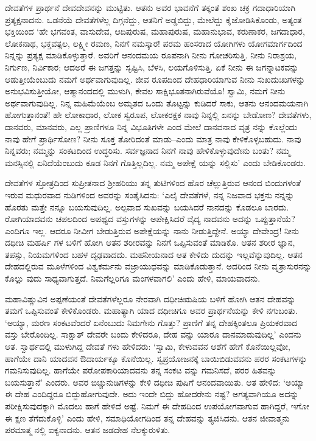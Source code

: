 ದೇವತೆಗಳ ಪ್ರಾರ್ಥನೆ ದೇವದೇವನನ್ನು ಮುಟ್ಟಿತು. ಆತನು ಅವರ ಭಾವನೆಗೆ ತಕ್ಕಂತೆ ಶಂಖ ಚಕ್ರ ಗದಾಧಾರಿಯಾಗಿ ಪ್ರತ್ಯಕ್ಷನಾದನು. ಒಡನೆಯೆ ದೇವತೆಗಳೆಲ್ಲ ದಿಗ್ಗನೆದ್ದು, ಆತನಿಗೆ ಅಡ್ಡಬಿದ್ದು, ಮೇಲೆದ್ದು ಕೈಜೋಡಿಸಿಕೊಂಡು, ಅತ್ಯಂತ ಭಕ್ತಿಯಿಂದ ‘ಹೇ ಭಗವಂತ, ವಾಸುದೇವ, ಆದಿಪುರುಷ, ಮಹಾಪುರುಷ, ಮಹಾನುಭಾವ, ಕರುಣಾಕರ, ಜಗದಾಧಾರ, ಲೋಕನಾಥ, ಭಕ್ತವತ್ಸಲ, ಲಕ್ಷ್ಮೀ ರಮಣ, ನಿನಗೆ ನಮಸ್ಕಾರ! ಪರಮ ಹಂಸರಾದ ಯೋಗಿಗಳು ಯೋಗಮಾರ್ಗದಿಂದ ನಿನ್ನನ್ನು ಪ್ರತ್ಯಕ್ಷ ಮಾಡಿಕೊಳ್ಳುತ್ತಾರೆ. ಅವರಿಗೆ ಆನಂದಮಯ ರೂಪನಾಗಿ ನೀನು ಗೋಚರಿಸುತ್ತಿ. ನೀನು ನಿರಾಶ್ರಯ, ನಿರ್ಗುಣ, ನಿರ್ವಿಕಾರ; ಆದಅರೆ ಈ ಜಗತ್ತನ್ನು ಸೃಷ್ಟಿಸಿ, ಬೆಳಸಿ, ಲಯಗೊಳಿಸುತ್ತಿ. ಏಕೆ ನೀನು ಈ ಜಗನ್ನಾಟಕವನ್ನು ಆಡುತ್ತೀಯೆಂಬುದು ನಮಗೆ ಅರ್ಥವಾಗುವುದಿಲ್ಲ. ಜೀವ ರೂಪದಿಂದ ದೇಹಧಾರಿಯಾಗುವ ನೀನು ಸುಖದುಃಖಗಳನ್ನು ಅನುಭವಿಸುತ್ತೀಯೋ, ಆತ್ಮಾನಂದದಲ್ಲಿ ಮುಳುಗಿ, ಕೇವಲ ಸಾಕ್ಷಿಭೂತನಾಗಿರುವೆಯೊ! ಸ್ವಾಮಿ, ನಮಗೆ ನೀನು ಅರ್ಥವಾಗುವುದಿಲ್ಲ. ನಿನ್ನ ಮಹಿಮೆಯೆಂಬ ಅಮೃತದ ಒಂದು ತೊಟ್ಟನ್ನು ಕುಡಿದರೆ ಸಾಕು, ಆತನು ಆನಂದಮಯನಾಗಿ ಹೋಗುತ್ತಾನಂತೆ! ಹೇ ಲೋಕಾಧಾರ, ಲೋಕ ಸ್ವರೂಪ, ಲೋಕರಕ್ಷಕ ನಾವು ನಿನ್ನಲ್ಲಿ ಏನನ್ನು ಬೇಡೋಣ? ದೇವತೆಗಳು, ದಾನವರು, ಮಾನವರು, ಎಲ್ಲ ಪ್ರಾಣಿಗಳೂ ನಿನ್ನ ವಿಭೂತಿಗಳೇ ಎಂದ ಮೇಲೆ ದಾನವನಾದ ವೃತ್ರ ನನ್ನು ಕೊಲ್ಲೆಂದು ನಾವು ಹೇಗೆ ಪ್ರಾರ್ಥಿಸೋಣ? ನೀನು ಸೂಕ್ತ ತೋರಿದಂತೆ ಮಾಡು–ಎಂದು ಮಾತ್ರ ನಾವು ಕೇಳಿಕೊಳ್ಳಬಹುದು. ನಾವು ನಿನ್ನವರು; ನಮ್ಮನ್ನು ಸಂಕಟದಿಂದ ಉದ್ಧರಿಸು. ಸರ್ವಜ್ಞನಾದ ನಿನಗೆ ನಾವು ಹೇಳಿಕೊಳ್ಳುವುದೇನು ಬಂತು? ನಮ್ಮ ಮನಸ್ಸಿನಲ್ಲಿ ಏನಿದೆಯೆಂಬುದು ಕೂಡ ನಿನಗೆ ಗೊತ್ತಿಲ್ಲದಿಲ್ಲ. ನಮ್ಮ ಅಪೇಕ್ಷೆ ಯನ್ನು ಸಲ್ಲಿಸು’ ಎಂದು ಬೇಡಿಕೊಂಡರು. 

ದೇವತೆಗಳ ಸ್ತೋತ್ರದಿಂದ ಸುಪ್ರೀತನಾದ ಶ್ರೀಹರಿಯು ತನ್ನ ತುಟಿಗಳಿಂದ ಹೊರ ಚೆಲ್ಲುತ್ತಿರುವ ಆನಂದ ಬಿಂದುಗಳಂತೆ ಇರುವ ಮಧುರವಾದ ನುಡಿಗಳಿಂದ ಅವರನ್ನು ಸಂತೈಸಿದನು: ‘ಎಲೈ ದೇವತೆಗಳೆ, ನನ್ನ ನಿಜವಾದ ಭಕ್ತನು ನನ್ನನ್ನು ಹೊರತು ಮತ್ತೇ ನನ್ನೂ ಬಯಸುವುದಿಲ್ಲ. ಅಲ್ಪವಾದ ಸುಖವನ್ನು ಬಯಸಿದರೆ ನಾನದನ್ನು ಕೊಡಲೂ ಬಾರದು. ರೋಗಿಯಾದವನು ಚಪಲದಿಂದ ಅಪಥ್ಯದ ವಸ್ತುಗಳನ್ನು ಅಪೇಕ್ಷಿಸಿದರೆ ವೈದ್ಯ ನಾದವನು ಅದನ್ನು ಒಪ್ಪುತ್ತಾನೆಯೆ? ಎಂದಿಗೂ ಇಲ್ಲ. ಆದರೂ ನೀವೀಗ ಬೇಡುತ್ತಿರುವ ಅಪೇಕ್ಷೆಯನ್ನು ನಾನು ನೀಡುತ್ತಿದ್ದೇನೆ. ಅಯ್ಯಾ ದೇವೇಂದ್ರ! ನೀನು ದಧೀಚಿ ಮಹರ್ಷಿ ಗಳ ಬಳಿಗೆ ಹೋಗಿ ಆತನ ಶರೀರವನ್ನು ನಿನಗೆ ಒಪ್ಪಿಸುವಂತೆ ಮಾಡಿಕೊ. ಆತನ ಶರೀರ ಜ್ಞಾನ, ತಪಸ್ಸು, ನಿಯಮಗಳಿಂದ ಬಹಳ ದೃಢವಾದದು. ಮಹನೀಯನಾದ ಆತ ಕೇಳಿದು ದುದನ್ನು ಇಲ್ಲವೆನ್ನುವುದಿಲ್ಲ. ಆತನ ದೇಹದಲ್ಲಿರುವ ಮೂಳೆಗಳಿಂದ ವಿಶ್ವಕರ್ಮನು ವಜ್ರಾಯುಧವನ್ನು ಮಾಡಿಕೊಡುತ್ತಾನೆ. ಅದರಿಂದ ನೀನು ವೃತ್ರಾಸುರನನ್ನು ಕೊಲ್ಲು ವುದು ಸಾಧ್ಯವಾಗುತ್ತದೆ. ನಿಮಗೆಲ್ಲರಿಗೂ ಮಂಗಳವಾಗಲಿ’ ಎಂದು ಹೇಳಿ, ಮಾಯವಾದನು.

ಮಹಾವಿಷ್ಣುವಿನ ಅಪ್ಪಣೆಯಂತೆ ದೇವತೆಗಳೆಲ್ಲರೂ ನೇರವಾಗಿ ದಧೀಚಿಋಷಿಯ ಬಳಿಗೆ ಹೋಗಿ ಆತನ ದೇಹವನ್ನು ತಮಗೆ ಒಪ್ಪಿಸುವಂತೆ ಕೇಳಿಕೊಂಡರು. ಮಹಾತ್ಯಾಗಿ ಯಾದ ದಧೀಚಿಗೂ ಅವರ ಪ್ರಾರ್ಥನೆಯನ್ನು ಕೇಳಿ ನಗುಬಂತು. ‘ಅಯ್ಯಾ, ಮರಣ ಸಂಕಟವೆಂದರೆ ಏನೆಂಬುದು ನಿಮಗೇನು ಗೊತ್ತು? ಪ್ರಾಣಿಗೆ ತನ್ನ ದೇಹಕ್ಕಿಂತಲೂ ಪ್ರಿಯಕರವಾದ ವಸ್ತು ಬೇರೊಂದಿಲ್ಲ. ಸಾಕ್ಷಾತ್ ದೇವರೇ ಬಂದು ಕೇಳಿದರೂ, ದೇಹ ವನ್ನು ಯಾರೂ ದಾನಮಾಡುವುದಿಲ್ಲ’ ಎಂದನು ಆತ. ಸ್ವಾರ್ಥದಲ್ಲಿ ಮುಳುಗಿದ್ದ ದೇವತೆ ಗಳು ಹೇಳಿದರು: ‘ಸ್ವಾಮಿ, ಕೇಳುವವನ ಆಶೆಗೆ ಹೇಗೆ ಕೊನೆಯಿಲ್ಲವೋ, ಹಾಗೆಯೇ ದಾನಿ ಯಾದವನ ಔದಾರ್ಯಕ್ಕೂ ಕೊನೆಯಿಲ್ಲ. ಸ್ವಪ್ರಯೋಜನಕ್ಕೆ ಬಾಯಿಬಿಡುವವನು ಪರರ ಸಂಕಟಗಳನ್ನು ಗಮನಿಸುವುದಿಲ್ಲ. ಹಾಗೆಯೇ ಪರೋಪಕಾರಿಯಾದವನು ತನ್ನ ಸಂಕಟ ವನ್ನು ಗಮನಿಸದೆ, ಪರರ ಹಿತವನ್ನು ಬಯಸುತ್ತಾನೆ’ ಎಂದರು. ಅವರ ಬಿಚ್ಚುನುಡಿಗಳನ್ನು ಕೇಳಿ ದಧೀಚಿ ಪುಷಿಗೆ ಆನಂದವಾಯಿತು. ಆತ ಹೇಳಿದ: ‘ಅಯ್ಯಾ ಈ ದೇಹ ಎಂದಿದ್ದರೂ ಬಿದ್ದುಹೋಗುವುದೇ. ಅದು ಇಂದೇ ಬಿದ್ದು ಹೋದರೇನು ನಷ್ಟ? ಅಗತ್ಯವಾಗಿಯೂ ಅದನ್ನು ಪರೀಕ್ಷಿಸುವುದಕ್ಕಾಗಿ ಮೊದಲು ಹಾಗೆ ಹೇಳಿದೆ ಅಷ್ಟೆ. ನಿಮಗೆ ಈ ದೇಹದಿಂದ ಉಪಯೋಗವಾಗುವ ಹಾಗಿದ್ದರೆ, ಇಗೋ ಈ ಕ್ಷಣ ತೆಗೆದುಕೊಳ್ಳಿ’ ಎಂದು ಹೇಳಿ, ಸಮಾಧಿಯೋಗದಿಂದ ತನ್ನ ದೇಹವನ್ನು ತ್ಯಜಿಸಿದನು. ಆತನ ಜೀವಾತ್ಮನು ಪರಮಾತ್ಮ ನಲ್ಲಿ ಐಕ್ಯನಾದನು. ಆತನ ಜಡದೇಹ ನೆಲಕ್ಕುರುಳಿತು.

